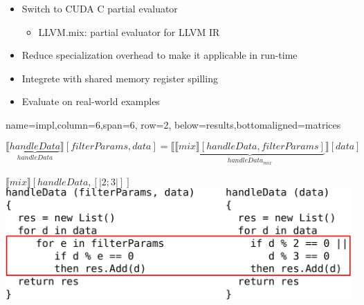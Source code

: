 \documentclass[a0paper,portrait]{baposter}
\begin{document}
\begin{poster}
{  \begin{itemize}
    \item Switch to CUDA C partial evaluator
    \begin{itemize}
      \item LLVM.mix: partial evaluator for LLVM IR
    \end{itemize}
    \item Reduce specialization overhead to make it applicable in run-time
    \item Integrete with shared memory register spilling~\cite{DBLP:journals/corr/abs-1907-02894}
    \item Evaluate on real-world examples
  \end{itemize}

}


{name=impl,column=6,span=6, row=2, below=results,bottomaligned=matrices}
{
$$ \llbracket \underbrace{handleData}_{handleData} \rrbracket [filterParams, data] =  \llbracket \underbrace{\llbracket mix \rrbracket [handleData,filterParams]}_{handleData_{mix}}\rrbracket [data]$$

\hspace{7cm}$\llbracket mix \rrbracket [handleData,[|2;3|]]$\\

\includegraphics[width=0.99\textwidth]{figures/CodeSample2.pdf}
}




\end{poster}
\end{document}
